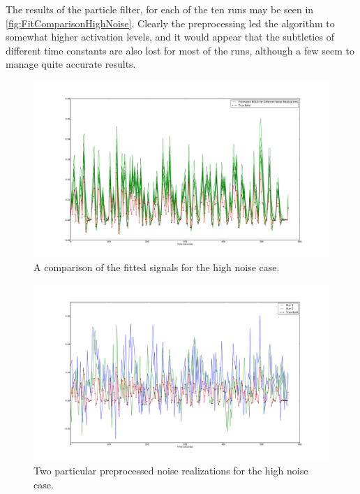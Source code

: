 The results of the particle filter, for each of the ten runs may be seen in 
\autoref{fig:FitComparisonHighNoise}. Clearly the preprocessing led the algorithm
to somewhat higher activation levels, and it would appear that the subtleties of
different time constants are also lost for most of the runs, although a few seem
to manage quite accurate results. 

\begin{figure}[H]
\label{fig:FitComparisonHighNoise}
\includegraphics[trim=6cm 3cm 6cm 3cm,width=16cm]{images/comparison_highnoise}
\caption{A comparison of the fitted signals for the high noise case.}
\end{figure}
\begin{figure}[H]
\label{fig:NoiseComparisonJustTwo}
\includegraphics[trim=6cm 3cm 6cm 3cm,width=16cm]{images/highnoise_56_noise}
\caption{Two particular preprocessed noise realizations for the high noise case.}
\end{figure}
